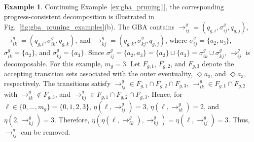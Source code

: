 \documentclass[lettersize,journal]{IEEEtran}
\theoremstyle{italiclemma}
\newtheorem{lemma}{Lemma}
\theoremstyle{italiclemma}
\theoremstyle{definition}
\newtheorem{example}{Example}
\begin{document}
\begin{example}\label{ex:gba_pruning2}
Continuing Example~\ref{ex:gba_pruning1}, the corresponding progress-consistent decomposition is illustrated in Fig.~\ref{fig:gba_pruning_examples}(b). The GBA contains $\rightarrow^g_{ij}=(q_{g,i},\sigma^g_{ij},q_{g,j})$, $\rightarrow^g_{ik}=(q_{g,i},\sigma^g_{ik},q_{g,k})$, and $\rightarrow^g_{kj}=(q_{g,k},\sigma^g_{kj},q_{g,j})$, where $\sigma^g_{ij}=\{a_2,a_3\}$, $\sigma^g_{ik}=\{a_2\}$, and $\sigma^g_{kj}=\{a_3\}$. Since $\sigma^g_{ij}=\{a_2,a_3\} =\{a_2\}\cup\{a_3\}
 =\sigma^g_{ik}\cup\sigma^g_{kj}$, $\rightarrow^g_{ij}$ is decomposable. For this example, $m_g=3$. Let $F_{g,1}$, $F_{g,2}$, and $F_{g,3}$ denote the accepting transition sets associated with the outer eventuality, $\Diamond a_2$, and $\Diamond a_3$, respectively. The transitions satisfy $\rightarrow^g_{ij}\in F_{g,1}\cap F_{g,2}\cap F_{g,3}$, $\rightarrow^g_{ik}\in F_{g,1}\cap F_{g,2}$ with $\rightarrow^g_{ik}\notin F_{g,3}$, and $\rightarrow^g_{kj}\in F_{g,1}\cap F_{g,2}\cap F_{g,3}$. Hence, for  $\ell\in\{0,\ldots,m_g\}=\{0,1,2,3\}$, $\eta(\ell,\rightarrow^g_{ij})=3$, $\eta(\ell,\rightarrow^g_{ik})=2$, and $\eta(2,\rightarrow^g_{kj})=3$. Therefore, $\eta(\eta(\ell,\rightarrow^g_{ik}),\rightarrow^g_{kj})=\eta(\ell,\rightarrow^g_{ij})=3$.
Thus, $\rightarrow^g_{ij}$ can be removed.
\end{example}


\end{document}
